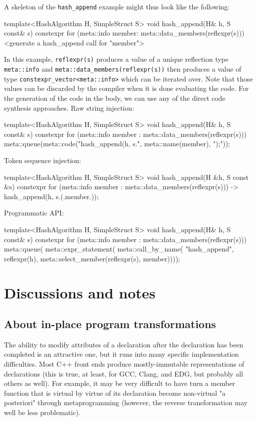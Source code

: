 \documentclass{wg21}
\newcommand{\cc}[1]{\texttt{#1}}
\begin{document}
A skeleton of the \cc{hash_append} example might thus look like the following:

\begin{cpp}
template<HashAlgorithm H, SimpleStruct S>
void hash_append(H& h, S const& s) {
  constexpr {
    for (meta::info member: meta::data_members(reflexpr(s))) {
      <generate a hash_append call for "member">
    }
  }
}
\end{cpp}

In this example, \cc{reflexpr(s)} produces a value of a unique reflection type
\cc{meta::info} and \cc{meta::data_members(reflexpr(s))} then produces a value
of type \cc{constexpr_vector<meta::info>} which can be iterated over. Note that
those values can be discarded by the compiler when it is done evaluating the
code. For the generation of the code in the body, we can use any of the direct
code synthesis approaches. Raw string injection:

\begin{cpp}
template<HashAlgorithm H, SimpleStruct S>
void hash_append(H& h, S const& s) {
  constexpr {
    for (meta::info member : meta::data_members(reflexpr(s))) {
      meta::queue(meta::code("hash_append(h, s.", meta::name(member), ");"));
    }
  }
}
\end{cpp}

Token sequence injection:

\begin{cpp}
template<HashAlgorithm H, SimpleStruct S>
void hash_append(H &h, S const &s) {
  constexpr {
    for (meta::info member : meta::data_members(reflexpr(s))) {
      -> { hash_append(h, s.(.member.)); }
    }
  }
}
\end{cpp}

Programmatic API:

\begin{cpp}
template<HashAlgorithm H, SimpleStruct S>
void hash_append(H& h, S const& s) {
  constexpr {
    for (meta::info member : meta::data_members(reflexpr(s))) {
      meta::queue(
        meta::expr_statement(
          meta::call_by_name(
            "hash_append",
            reflexpr(h),
            meta::select_member(reflexpr(s), member))));
    }
  }
}
\end{cpp}


\section{Discussions and notes}
\subsection{About in-place program transformations}
The ability to modify attributes of a declaration after the declaration has been
completed is an attractive one, but it runs into many specific implementation
difficulties. Most C++ front ends produce mostly-immutable representations of
declarations (this is true, at least, for GCC, Clang, and EDG, but probably all
others as well). For example, it may be very difficult to have turn a member
function that is virtual by virtue of its declaration become non-virtual
"a posteriori" through metaprogramming (however, the reverse transformation
may well be less problematic).
\end{document}
